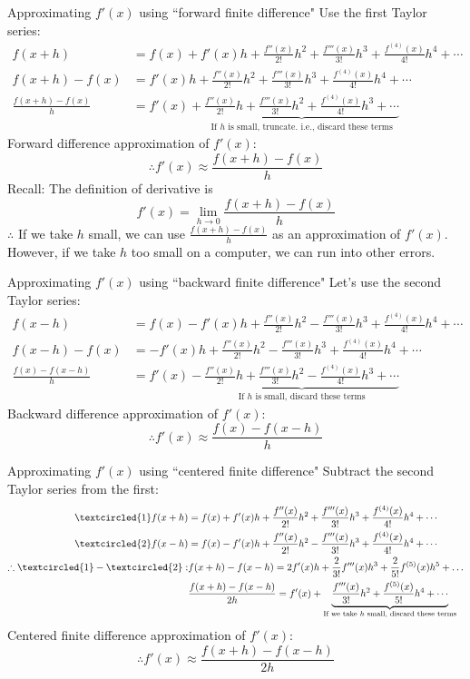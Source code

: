 \documentclass[12pt,a4paper]{article}
\begin{document}
\begin{thm}{Approximating $f'(x)$ using ``forward finite difference"}
	Use the first Taylor series: 
	\[\begin{aligned}
		f(x+h)&=f(x)+f'(x)h+\frac{f''(x)}{2!}h^2+\frac{f'''(x)}{3!}h^3+\frac{f^{(4)}(x)}{4!}h^4+\cdots\\
		f(x+h)-f(x)&=f'(x)h+\frac{f''(x)}{2!}h^2+\frac{f'''(x)}{3!}h^3+\frac{f^{(4)}(x)}{4!}h^4+\cdots\\
		\frac{f(x+h)-f(x)}{h}&=f'(x)+\underbrace{\frac{f''(x)}{2!}h+\frac{f'''(x)}{3!}h^2+\frac{f^{(4)}(x)}{4!}h^3+\cdots}_{\text{If }h\text{ is small, truncate. i.e., discard these terms}}
	\end{aligned}\]
	Forward difference approximation of $f'(x)$: 
	\[\boxed{\therefore f'(x)\approx\frac{f(x+h)-f(x)}{h}}\]
	Recall: The definition of derivative is \[f'(x)=\lim_{h\to0}\frac{f(x+h)-f(x)}{h}\]
	$\therefore$ If we take $h$ small, we can use $\displaystyle\frac{f(x+h)-f(x)}{h}$ as an approximation of $f'(x).$\\
	However, if we take $h$ too small on a computer, we can run into other errors. 
\end{thm}
\begin{thm}{Approximating $f'(x)$ using ``backward finite difference"}
	Let's use the second Taylor series: 
	\[\begin{aligned}
		f(x-h)&=f(x)-f'(x)h+\frac{f''(x)}{2!}h^2-\frac{f'''(x)}{3!}h^3+\frac{f^{(4)}(x)}{4!}h^4+\cdots\\
		f(x-h)-f(x)&=-f'(x)h+\frac{f''(x)}{2!}h^2-\frac{f'''(x)}{3!}h^3+\frac{f^{(4)}(x)}{4!}h^4+\cdots\\
		\frac{f(x)-f(x-h)}{h}&=f'(x)-\underbrace{\frac{f''(x)}{2!}h+\frac{f'''(x)}{3!}h^2-\frac{f^{(4)}(x)}{4!}h^3+\cdots}_{\text{If }h\text{ is small, discard these terms}}
	\end{aligned}\]	
	Backward difference approximation of $f'(x)$: 
	\[\boxed{\therefore f'(x)\approx\frac{f(x)-f(x-h)}{h}}\]
\end{thm}
\begin{thm}{Approximating $f'(x)$ using ``centered finite difference"}
	Subtract the second Taylor series from the first: 	
	\[\begin{aligned}
		\textcircled{1} f(x+h)&=f(x)+f'(x)h+\frac{f''(x)}{2!}h^2+\frac{f'''(x)}{3!}h^3+\frac{f^{(4)}(x)}{4!}h^4+\cdots\\
		\textcircled{2} f(x-h)&=f(x)-f'(x)h+\frac{f''(x)}{2!}h^2-\frac{f'''(x)}{3!}h^3+\frac{f^{(4)}(x)}{4!}h^4+\cdots\\
		\therefore \textcircled{1}-\textcircled{2}: & f(x+h)-f(x-h)=2f'(x)h+\frac{2}{3!}f'''(x)h^3+\frac{2}{5!}f^{(5)}(x)h^5+\dots\\
		&\frac{f(x+h)-f(x-h)}{2h}=f'(x)+\underbrace{\frac{f'''(x)}{3!}h^2+\frac{f^{(5)}(x)}{5!}h^4+\cdots}_{\text{If we take }h\text{ small, discard these terms}}
	\end{aligned}\]
	Centered finite difference approximation of $f'(x)$: 
	\[\boxed{\therefore f'(x)\approx\frac{f(x+h)-f(x-h)}{2h}}\]
\end{thm}
\end{document}
